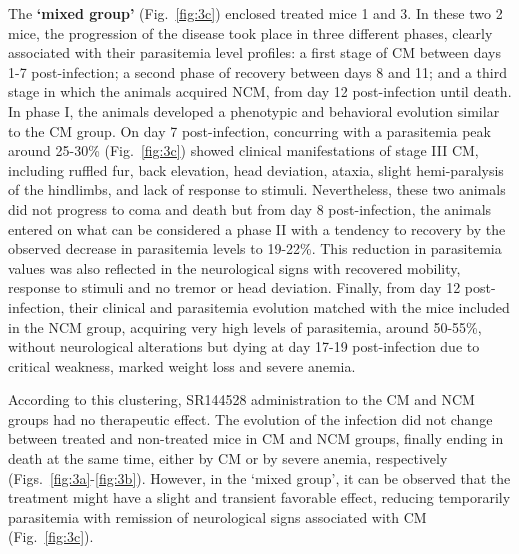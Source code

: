 \documentclass[empirical, authordate]{jote-new-article}
\begin{document}
The \textbf{`mixed group' }(Fig.~\ref{fig:3c}) enclosed treated mice 1 and 3. In these two 2 mice, the progression of the disease took place in three different phases, clearly associated with their parasitemia level profiles: a first stage of CM between days 1-7 post-infection; a second phase of recovery between days 8 and 11; and a third stage in which the animals acquired NCM, from day 12 post-infection until death. In phase I, the animals developed a phenotypic and behavioral evolution similar to the CM group. On day 7 post-infection, concurring with a parasitemia peak around 25-30\% (Fig.~\ref{fig:3c}) showed clinical manifestations of stage III CM, including ruffled fur, back elevation, head deviation, ataxia, slight hemi-paralysis of the hindlimbs, and lack of response to stimuli. Nevertheless, these two animals did not progress to coma and death but from day 8 post-infection, the animals entered on what can be considered a phase II with a tendency to recovery by the observed decrease in parasitemia levels to 19-22\%. This reduction in parasitemia values was also reflected in the neurological signs with recovered mobility, response to stimuli and no tremor or head deviation. Finally, from day 12 post-infection, their clinical and parasitemia evolution matched with the mice included in the NCM group, acquiring very high levels of parasitemia, around 50-55\%, without neurological alterations but dying at day 17-19 post-infection due to critical weakness, marked weight loss and severe anemia.


According to this clustering, SR144528 administration to the CM and NCM groups had no therapeutic effect. The evolution of the infection did not change between treated and non-treated mice in CM and NCM groups, finally ending in death at the same time, either by CM or by severe anemia, respectively (Figs.~\ref{fig:3a}-\ref{fig:3b}). However, in the `mixed group', it can be observed that the treatment might have a slight and transient favorable effect, reducing temporarily parasitemia with remission of neurological signs associated with CM (Fig.~\ref{fig:3c}).
\end{document}

